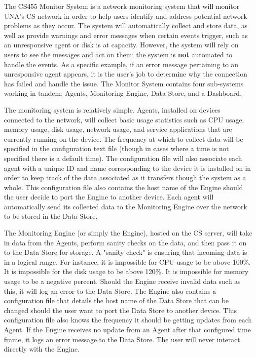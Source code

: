 \documentclass[letterpaper,12pt,oneside,listof=totoc]{scrreprt}
\begin{document}
The CS455 Monitor System is a network monitoring system that will monitor UNA's CS network in order to help users identify and address potential network problems as they occur. The system will automatically collect and store data, as well as provide warnings and error messages when certain events trigger, such as an unresponsive agent or disk is at capacity. However, the system will rely on users to see the messages and act on them; the system is \textbf{not} automated to handle the events. As a specific example, if an error message pertaining to an unresponsive agent appears, it is the user's job to determine why the connection has failed and handle the issue. The Monitor System contains four sub-systems working in tandem; Agents, Monitoring Engine, Data Store, and a Dashboard.

The monitoring system is relatively simple. Agents, installed on devices connected to the network, will collect basic usage statistics such as CPU usage, memory usage, disk usage, network usage, and service applications that are currently running on the device. The frequency at which to collect data will be specified in the configuration text file (though in cases where a time is not specified there is a default time). The configuration file will also associate each agent with a unique ID and name corresponding to the device it is installed on in order to keep track of the data associated as it transfers though the system as a whole. This configuration file also contains the host name of the Engine should the user decide to port the Engine to another device. Each agent will automatically send its collected data to the Monitoring Engine over the network to be stored in the Data Store.

The Monitoring Engine (or simply the Engine), hosted on the CS server, will take in data from the Agents, perform sanity checks on the data, and then pass it on to the Data Store for storage. A "sanity check" is ensuring that incoming data is in a logical range. For instance, it is impossible for CPU usage to be above 100\%. It is impossible for the disk usage to be above 120\%. It is impossible for memory usage to be a negative percent. Should the Engine receive invalid data such as this, it will log an error to the Data Store. The Engine also contains a configuration file that details the host name of the Data Store that can be changed should the user want to port the Data Store to another device. This configuration file also knows the frequency it should be getting updates from each Agent. If the Engine receives no update from an Agent after that configured time frame, it logs an error message to the Data Store. The user will never interact directly with the Engine.
\end{document}

